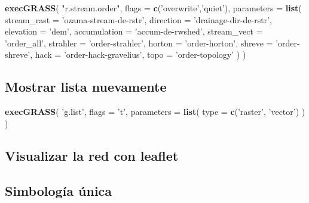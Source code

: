 \documentclass[11pt,]{article}
\newenvironment{Shaded}{\begin{snugshade}}{\end{snugshade}}
\newcommand{\KeywordTok}[1]{\textcolor[rgb]{0.13,0.29,0.53}{\textbf{#1}}}
\newcommand{\DataTypeTok}[1]{\textcolor[rgb]{0.13,0.29,0.53}{#1}}
\newcommand{\StringTok}[1]{\textcolor[rgb]{0.31,0.60,0.02}{#1}}
\newcommand{\NormalTok}[1]{#1}
\begin{document}
\begin{Shaded}
\begin{Highlighting}[]
\KeywordTok{execGRASS}\NormalTok{(}
  \StringTok{"r.stream.order"}\NormalTok{,}
  \DataTypeTok{flags =} \KeywordTok{c}\NormalTok{(}\StringTok{'overwrite'}\NormalTok{,}\StringTok{'quiet'}\NormalTok{),}
  \DataTypeTok{parameters =} \KeywordTok{list}\NormalTok{(}
    \DataTypeTok{stream_rast =} \StringTok{'ozama-stream-de-rstr'}\NormalTok{,}
    \DataTypeTok{direction =} \StringTok{'drainage-dir-de-rstr'}\NormalTok{,}
    \DataTypeTok{elevation =} \StringTok{'dem'}\NormalTok{,}
    \DataTypeTok{accumulation =} \StringTok{'accum-de-rwshed'}\NormalTok{,}
    \DataTypeTok{stream_vect =} \StringTok{'order_all'}\NormalTok{,}
    \DataTypeTok{strahler =} \StringTok{'order-strahler'}\NormalTok{,}
    \DataTypeTok{horton =} \StringTok{'order-horton'}\NormalTok{,}
    \DataTypeTok{shreve =} \StringTok{'order-shreve'}\NormalTok{,}
    \DataTypeTok{hack =} \StringTok{'order-hack-gravelius'}\NormalTok{,}
    \DataTypeTok{topo =} \StringTok{'order-topology'}
\NormalTok{  )}
\NormalTok{)}
\end{Highlighting}
\end{Shaded}

\subsection{Mostrar lista nuevamente}\label{mostrar-lista-nuevamente-1}

\begin{Shaded}
\begin{Highlighting}[]
\KeywordTok{execGRASS}\NormalTok{(}
  \StringTok{'g.list'}\NormalTok{,}
  \DataTypeTok{flags =} \StringTok{'t'}\NormalTok{,}
  \DataTypeTok{parameters =} \KeywordTok{list}\NormalTok{(}
    \DataTypeTok{type =} \KeywordTok{c}\NormalTok{(}\StringTok{'raster'}\NormalTok{, }\StringTok{'vector'}\NormalTok{)}
\NormalTok{  )}
\NormalTok{)}
\end{Highlighting}
\end{Shaded}

\subsection{Visualizar la red con
leaflet}\label{visualizar-la-red-con-leaflet}

\subsection{Simbología única}\label{simbologuxeda-uxfanica}
\end{document}

